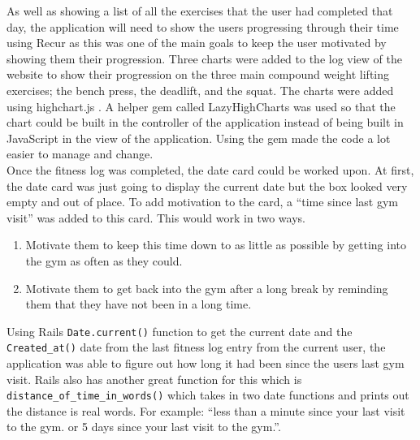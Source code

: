 As well as showing a list of all the exercises that the user had completed that day, the application will need to show the users progressing through their time using Recur as this was one of the main goals to keep the user motivated by showing them their progression. Three charts were added to the log view of the website to show their progression on the three main compound weight lifting exercises; the bench press, the deadlift, and the squat. The charts were added using highchart.js \citep{highcharts:2009}. A helper gem called LazyHighCharts \citep{lhc:2010} was used so that the chart could be built in the controller of the application instead of being built in JavaScript in the view of the application. Using the gem made the code a lot easier to manage and change.\\

Once the fitness log was completed, the date card could be worked upon. At first, the date card was just going to display the current date but the box looked very empty and out of place. To add motivation to the card, a ``time since last gym visit'' was added to this card. This would work in two ways.

\begin{enumerate}
\item Motivate them to keep this time down to as little as possible by getting into the gym as often as they could.
\item Motivate them to get back into the gym after a long break by reminding them that they have not been in a long time.
\end{enumerate}

Using Rails \lstinline{Date.current()} function to get the current date and the \lstinline{Created_at()} date from the last fitness log entry from the current user, the application was able to figure out how long it had been since the users last gym visit. Rails also has another great function for this which is \lstinline{distance_of_time_in_words()} which takes in two date functions and prints out the distance is real words. For example: ``less than a minute since your last visit to the gym. or 5 days since your last visit to the gym.''.\\

